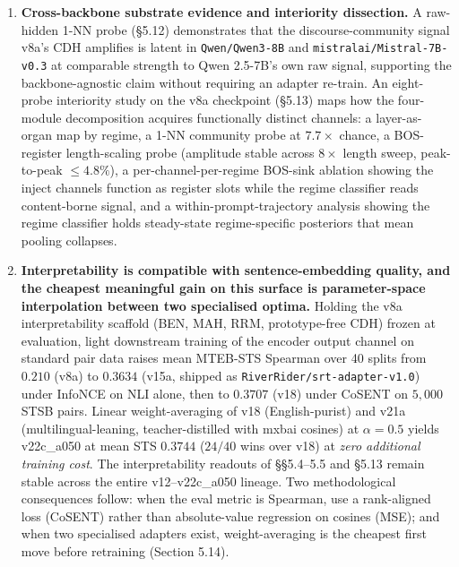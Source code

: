 \documentclass[
  11pt]{article}
\begin{document}
\begin{enumerate}
  5.9) ablates the 32-prototype mixing layer entirely, replacing the
  soft-argmax readout with the encoder's continuous 64-D output. CE is
  unchanged; every encoder-geometry metric improves substantially. v8b
  (Section 5.10) shows that pushing the supcon objective harder on the
  continuous architecture produces a softer version of the same
  collapse, bounding the design from above. The prototype layer was the
  binding constraint, not the supervision.
\item
  \textbf{Cross-backbone substrate evidence and interiority dissection.}
  A raw-hidden 1-NN probe (§5.12) demonstrates that the
  discourse-community signal v8a's CDH amplifies is latent in
  \texttt{Qwen/Qwen3-8B} and \texttt{mistralai/Mistral-7B-v0.3} at
  comparable strength to Qwen 2.5-7B's own raw signal, supporting the
  backbone-agnostic claim without requiring an adapter re-train. An
  eight-probe interiority study on the v8a checkpoint (§5.13) maps how
  the four-module decomposition acquires functionally distinct channels:
  a layer-as-organ map by regime, a 1-NN community probe at
  \(7.7\times\) chance, a BOS-register length-scaling probe (amplitude
  stable across \(8\times\) length sweep, peak-to-peak \(\leq 4.8\%\)),
  a per-channel-per-regime BOS-sink ablation showing the inject channels
  function as register slots while the regime classifier reads
  content-borne signal, and a within-prompt-trajectory analysis showing
  the regime classifier holds steady-state regime-specific posteriors
  that mean pooling collapses.
\item
  \textbf{Interpretability is compatible with sentence-embedding
  quality, and the cheapest meaningful gain on this surface is
  parameter-space interpolation between two specialised optima.} Holding
  the v8a interpretability scaffold (BEN, MAH, RRM, prototype-free CDH)
  frozen at evaluation, light downstream training of the encoder output
  channel on standard pair data raises mean MTEB-STS Spearman over 40
  splits from \(0.210\) (v8a) to \(0.3634\) (v15a, shipped as
  \texttt{RiverRider/srt-adapter-v1.0}) under InfoNCE on NLI alone, then
  to \(0.3707\) (v18) under CoSENT on \(5{,}000\) STSB pairs. Linear
  weight-averaging of v18 (English-purist) and v21a
  (multilingual-leaning, teacher-distilled with mxbai cosines) at
  \(\alpha = 0.5\) yields v22c\_a050 at mean STS \(0.3744\) (\(24/40\)
  wins over v18) at \emph{zero additional training cost}. The
  interpretability readouts of §§5.4--5.5 and §5.13 remain stable across
  the entire v12--v22c\_a050 lineage. Two methodological consequences
  follow: when the eval metric is Spearman, use a rank-aligned loss
  (CoSENT) rather than absolute-value regression on cosines (MSE); and
  when two specialised adapters exist, weight-averaging is the cheapest
  first move before retraining (Section 5.14).
\end{enumerate}
\end{document}
